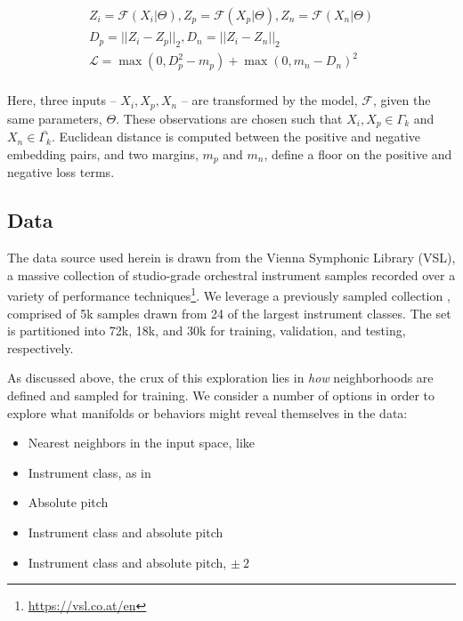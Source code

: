 \documentclass{article}
\begin{document}
\begin{align*}
Z_i = \mathcal{F}(X_i | \Theta), Z_p = \mathcal{F}(X_p | \Theta), Z_n = \mathcal{F}(X_n | \Theta)\\
D_p = || Z_i - Z_p ||_2, D_n = || Z_i - Z_n ||_2\\
\mathcal{L} = \max(0, D_p^2 - m_{p}) + \max(0, m_{n} - D_n)^2 \\
\end{align*}

Here, three inputs -- $X_i, X_p, X_n$ -- are transformed by the model, $\mathcal{F}$, given the same parameters, $\Theta$.
These observations are chosen such that $X_i, X_p \in \Gamma_k$ and $X_n \in \bar{\Gamma_k}$.
Euclidean distance is computed between the positive and negative embedding pairs, and two margins, $m_p$ and $m_n$, define a floor on the positive and negative loss terms.

\subsection{Data}

The data source used herein is drawn from the Vienna Symphonic Library (VSL), a massive collection of studio-grade orchestral instrument samples recorded over a variety of performance techniques\footnote{\url{https://vsl.co.at/en}}.
We leverage a previously sampled collection \cite{humphrey2015dl4mir}, comprised of 5k samples drawn from 24 of the largest instrument classes.
The set is partitioned into 72k, 18k, and 30k for training, validation, and testing, respectively.

As discussed above, the crux of this exploration lies in \emph{how} neighborhoods are defined and sampled for training.
We consider a number of options in order to explore what manifolds or behaviors might reveal themselves in the data:

\begin{itemize}
\item Nearest neighbors in the input space, like \cite{hadsell2006drlim}
\item Instrument class, as in \cite{humphrey2011nlse}
\item Absolute pitch
\item Instrument class and absolute pitch
\item Instrument class and absolute pitch, $\pm~2$
\end{itemize}
\end{document}
